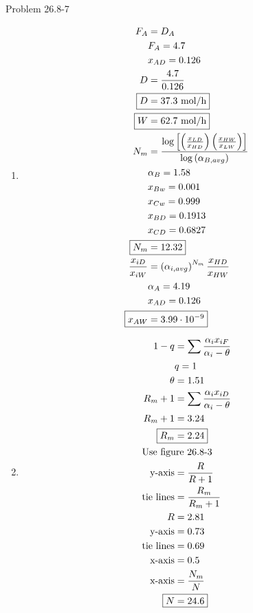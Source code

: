 \item

Problem 26.8-7

\begin{enumerate}
    \item 
    \begin{align*}
        F_A &= D_A \\
        & F_A = 4.7 \\
        & x_{AD} = 0.126\\
        D &= \frac{4.7}{0.126} \\
        \Aboxed{D &= 37.3 \text{ mol/h}} \\
        \Aboxed{W &= 62.7 \text{ mol/h}} \\  
        N_m &= \frac{\log\left[\left(\frac{x_{LD}}{x_{HD}}\right)\left(\frac{x_{HW}}{x_{LW}}\right)\right]}{\log\left(\alpha_{B, avg}\right)} \\
        & \alpha_B = 1.58 \\
        & x_{Bw} = 0.001 \\
        & x_{Cw} = 0.999 \\
        & x_{BD} = 0.1913 \\
        & x_{CD} = 0.6827 \\
        \Aboxed{N_m &= 12.32} \\
        \frac{x_{iD}}{x_{iW}} &= \left(\alpha_{i,avg}\right)^{N_m} \frac{x_{HD}}{x_{HW}} \\
        & \alpha_A = 4.19 \\
        & x_{AD} = 0.126 \\
        \Aboxed{x_{AW} &= 3.99\cdot10^{-9}}
    \end{align*}

    \item 
    \begin{align*}
        1-q &= \sum \frac{\alpha_ix_{iF}}{\alpha_i-\theta} \\
        & q = 1 \\
        \theta &= 1.51 \\
        R_m + 1 &= \sum \frac{\alpha_ix_{iD}}{\alpha_i-\theta} \\
        R_m + 1 &= 3.24 \\
        \Aboxed{R_m &= 2.24} \\
        \intertext{Use figure 26.8-3}
        \text{y-axis} &= \frac{R}{R+1} \\
        \text{tie lines} &= \frac{R_m}{R_m+1} \\
        R &= 2.81 \\
        \text{y-axis} &= 0.73 \\
        \text{tie lines} &= 0.69 \\
        \text{x-axis} &= 0.5 \\
        \text{x-axis} &= \frac{N_m}{N} \\
        \Aboxed{N &= 24.6}
    \end{align*}
\end{enumerate}
